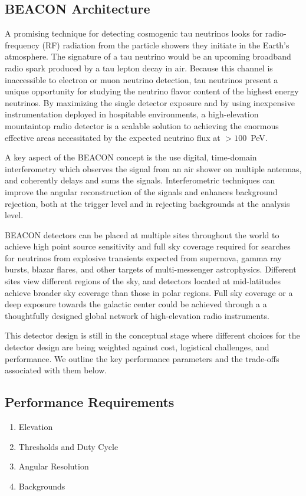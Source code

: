 \documentclass[12pt]{article}
\begin{document}
\subsection{BEACON Architecture}

A promising technique for detecting cosmogenic tau neutrinos looks for radio-frequency (RF) radiation from the particle showers they initiate in the Earth's atmosphere. The signature of a tau neutrino would be an upcoming broadband radio spark produced by a tau lepton decay in air. Because this channel is inaccessible to electron or muon neutrino detection, tau neutrinos present a unique opportunity for studying the neutrino flavor content of the highest energy neutrinos. By maximizing the single detector exposure and by using inexpensive instrumentation deployed in hospitable environments, a high-elevation mountaintop radio detector is a scalable solution to achieving the enormous effective areas necessitated by the expected neutrino flux at $>100$~PeV. 

A key aspect of the BEACON concept is the use digital, time-domain interferometry which observes the signal from an air shower on multiple antennas, and coherently delays and sums the signals. Interferometric techniques can improve the angular reconstruction of the signals and enhances background rejection, both at the trigger level and in rejecting backgrounds at the analysis level. 

BEACON detectors can be placed at multiple sites throughout the world to achieve high point source sensitivity and full sky coverage required for searches for neutrinos from explosive transients expected from supernova, gamma ray bursts, blazar flares, and other targets of multi-messenger astrophysics. Different sites view different regions of the sky, and detectors located at mid-latitudes achieve broader sky coverage than those in polar regions. Full sky coverage or a deep exposure towards the galactic center could be achieved through a a thoughtfully designed global network of high-elevation radio instruments. 

This detector design is still in the conceptual stage where different choices for the detector design are being weighted against cost, logistical challenges, and performance. We outline the key performance parameters and the trade-offs associated with them below.

\subsection{Performance Requirements}
\begin{enumerate}
\item Elevation
\item Thresholds and Duty Cycle
\item Angular Resolution
\item Backgrounds
\end{enumerate}
\end{document}
